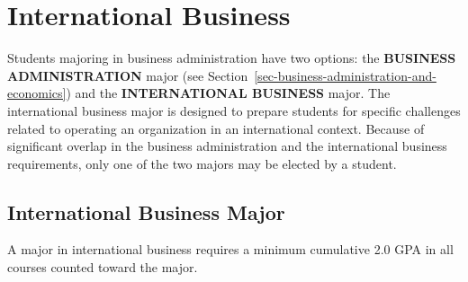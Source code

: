 \documentclass[
  letterpaper,
]{scrbook}
\begin{document}
\section{International Business}\label{sec-international-business}

Students majoring in business administration have two options: the
\textbf{BUSINESS ADMINISTRATION} major (see
Section~\ref{sec-business-administration-and-economics}) and the
\textbf{INTERNATIONAL BUSINESS} major. The international business major
is designed to prepare students for specific challenges related to
operating an organization in an international context. Because of
significant overlap in the business administration and the international
business requirements, only one of the two majors may be elected by a
student.

\subsection{International Business
Major}\label{international-business-major}

A major in international business requires a minimum cumulative 2.0 GPA
in all courses counted toward the major.
\end{document}
